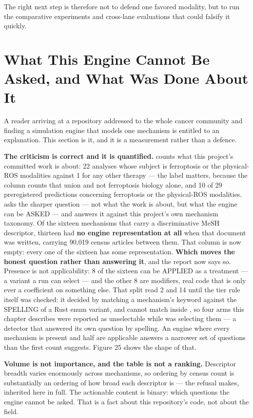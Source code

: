 \documentclass[11pt,twoside,openright]{report}
\begin{document}
The right next step is therefore not to defend one favored modality, but to run the comparative experiments and cross-lane evaluations that could falsify it quickly.

\section{What This Engine Cannot Be Asked, and What Was Done About It}

A reader arriving at a repository addressed to the whole cancer community and finding a simulation engine that models one mechanism is entitled to an explanation. This section is it, and it is a measurement rather than a defence.

\textbf{The criticism is correct and it is quantified.}  counts what this project's committed work is about: 22 analyses whose subject is ferroptosis or the physical-ROS modalities against 1 for any other therapy --- the label matters, because the column counts that union and not ferroptosis biology alone, and 10 of 29 preregistered predictions concerning ferroptosis or the physical-ROS modalities.  asks the sharper question --- not what the work is about, but what the engine can be ASKED --- and answers it against this project's own mechanism taxonomy. Of the sixteen mechanisms that carry a discriminative MeSH descriptor, thirteen had \textbf{no engine representation at all} when that document was written, carrying 90,019 census articles between them. That column is now empty: every one of the sixteen has some representation. \textbf{Which moves the honest question rather than answering it}, and the report now says so. Presence is not applicability: 8 of the sixteen can be APPLIED as a treatment --- a variant a run can select --- and the other 8 are modifiers, real code that is only ever a coefficient on something else. That split read 2 and 14 until the tier rule itself was checked: it decided by matching a mechanism's keyword against the SPELLING of a Rust enum variant, and  cannot match inside , so four arms this chapter describes were reported as unselectable while  was selecting them --- a detector that answered its own question by spelling. An engine where every mechanism is present and half are applicable answers a narrower set of questions than the first count suggests. Figure 25 shows the shape of that.

\textbf{Volume is not importance, and the table is not a ranking.} Descriptor breadth varies enormously across mechanisms, so ordering by census count is substantially an ordering of how broad each descriptor is --- the refusal  makes, inherited here in full. The actionable content is binary: which questions the engine cannot be asked. That is a fact about this repository's code, not about the field.
\end{document}
